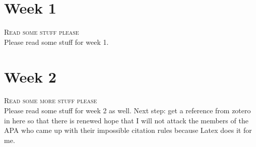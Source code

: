
\section*{Week 1}
\textsc{ Read some stuff please}\\
Please read some stuff for week 1.

\section*{Week 2}
\textsc{ Read some more stuff please}\\
Please read some stuff for week 2 as well. Next step: get a reference from zotero in here so that there is renewed hope that I will not attack the members of the APA who came up with their impossible citation rules because Latex does it for me.
